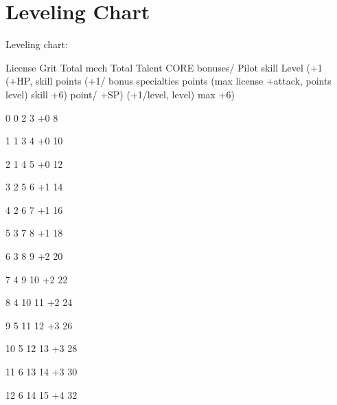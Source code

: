  \section{Leveling Chart}
 
 Leveling chart:  

       License
   Grit        Total mech       Total Talent  CORE bonuses/           Pilot skill  
       Level (+1   (+HP,      skill
           points (+1/   bonus specialties       points (max  
       license    +attack,    points
          level)                                skill +6) 
       point/     +SP)        (+1/level,  
       level)                 max +6) 

       0           0           2               3              +0                     8 

       1           1           3               4              +0                      10 

       2           1           4               5              +0                      12 

       3           2           5               6              +1                      14 

       4           2           6               7              +1                      16 

       5           3           7               8              +1                      18 

       6           3           8               9              +2                      20 

       7           4           9               10             +2                      22 

       8           4          10               11             +2                      24 

       9           5          11               12             +3                      26 

       10          5          12               13             +3                      28 

       11          6          13               14             +3                      30 

       12          6          14               15             +4                      32 

                                                                                                       
